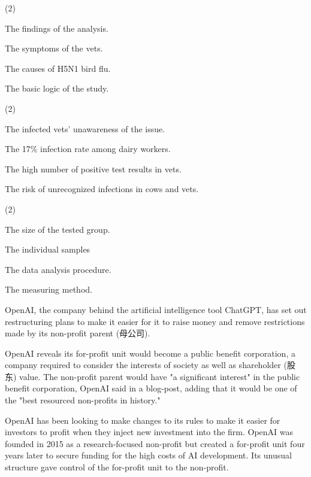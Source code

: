 \documentclass{英语试卷}
\begin{document}
\begin{choices}(2)
  \item The findings of the analysis.
  \item The symptoms of the vets.
  \item The causes of H5N1 bird flu.
  \item The basic logic of the study.
\end{choices}
\begin{choices}(2)
  \item The infected vets' unawareness of the issue.
  \item The 17\% infection rate among dairy workers.
  \item The high number of positive test results in vets.
  \item The risk of unrecognized infections in cows and vets.
\end{choices}
\begin{choices}(2)
  \item The size of the tested group.
  \item The individual samples
  \item The data analysis procedure.
  \item The measuring method.
\end{choices}
\par OpenAI, the company behind the artificial intelligence tool ChatGPT, has set out restructuring plans to make it easier for it to raise money and remove restrictions made by its non-profit parent (母公司).\par
\par OpenAI reveals its for-profit unit would become a public benefit corporation, a company required to consider the interests of society as well as shareholder (股东) value. The non-profit parent would have "a significant interest" in the public benefit corporation, OpenAI said in a blog-post, adding that it would be one of the "best resourced non-profits in history."\par
\par OpenAI has been looking to make changes to its rules to make it easier for investors to profit when they inject new investment into the firm. OpenAI was founded in 2015 as a research-focused non-profit but created a for-profit unit four years later to secure funding for the high costs of AI development. Its unusual structure gave control of the for-profit unit to the non-profit.\par
\end{document}

